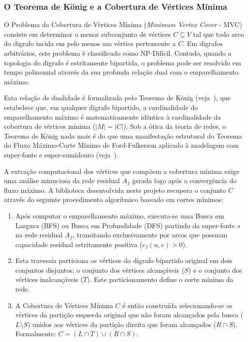 \documentclass[12pt,a4paper]{article}
\begin{document}
\subsubsection{O Teorema de König e a Cobertura de Vértices Mínima}

O Problema da Cobertura de Vértices Mínima (\textit{Minimum Vertex Cover} - MVC) consiste em determinar o menor subconjunto de vértices $C \subseteq V$ tal que todo arco do digrafo incida em pelo menos um vértice pertencente a $C$. Em digrafos arbitrários, este problema é classificado como NP-Difícil. Contudo, quando a topologia do digrafo é estritamente bipartida, o problema pode ser resolvido em tempo polinomial através da sua profunda relação dual com o emparelhamento máximo.

Esta relação de dualidade é formalizada pelo Teorema de König (veja~\cite{korte2018combinatorial}), que estabelece que, em qualquer digrafo bipartido, a cardinalidade do emparelhamento máximo é matematicamente idêntica à cardinalidade da cobertura de vértices mínima ($|M| = |C|$). Sob a ótica da teoria de redes, o Teorema de König nada mais é do que uma manifestação estrutural do Teorema do Fluxo Máximo-Corte Mínimo de Ford-Fulkerson aplicado à modelagem com super-fonte e super-sumidouro (veja~\cite{ahuja1993network}).

A extração computacional dos vértices que compõem a cobertura mínima exige uma análise minuciosa da rede residual $A_f$ gerada logo após a convergência do fluxo máximo. A biblioteca desenvolvida neste projeto recupera o conjunto $C$ através do seguinte procedimento algorítmico baseado em cortes mínimos:

\begin{enumerate}
    \item Após computar o emparelhamento máximo, executa-se uma Busca em Largura (BFS) ou Busca em Profundidade (DFS) partindo da super-fonte $s$ na rede residual $A_f$, transitando exclusivamente por arcos que possuam capacidade residual estritamente positiva ($c_f(u,v) > 0$).
    \item Esta travessia particiona os vértices do digrafo bipartido original em dois conjuntos disjuntos: o conjunto dos vértices alcançáveis ($S$) e o conjunto dos vértices inalcançáveis ($T$). Este particionamento define o corte mínimo da rede.
    \item A Cobertura de Vértices Mínima $C$ é então construída selecionando-se os vértices da partição esquerda original que não foram alcançados pela busca ($L \setminus S$) unidos aos vértices da partição direita que foram alcançados ($R \cap S$). Formalmente: $C = (L \cap T) \cup (R \cap S)$.
\end{enumerate}
\end{document}
